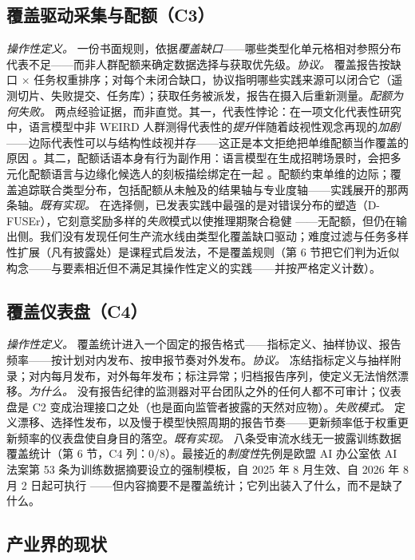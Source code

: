 \documentclass[10pt,fontset=fandol]{ctexart}
\begin{document}
\subsection{覆盖驱动采集与配额（C3）}

\emph{操作性定义。} 一份书面规则，依据\emph{覆盖缺口}——哪些类型化单元格相对参照分布代表不足——而非人群配额来确定数据选择与获取优先级。\emph{协议。} 覆盖报告按缺口 $\times$ 任务权重排序；对每个未闭合缺口，协议指明哪些实践来源可以闭合它（遥测切片、失败提交、任务库）；获取任务被派发，报告在摄入后重新测量。\emph{配额为何失败。} 两点经验证据，而非直觉。其一，代表性悖论：在一项文化代表性研究中，语言模型中非 WEIRD 人群测得代表性的\emph{提升}伴随着歧视性观念再现的\emph{加剧}——边际代表性可以与结构性歧视并存——这正是本文拒绝把单维配额当作覆盖的原因 \cite{ref14}。其二，配额话语本身有行为副作用：语言模型在生成招聘场景时，会把多元化配额语言与边缘化候选人的刻板描绘绑定在一起 \cite{ref15}。配额约束单维的边际；覆盖追踪联合类型分布，包括配额从未触及的结果轴与专业度轴——实践展开的那两条轴。\emph{既有实现。} 在选择侧，已发表实践中最强的是对错误分布的塑造（D-FUSEr），它刻意奖励多样的\emph{失败}模式以使推理期聚合稳健 \cite{ref16}——无配额，但仍在输出侧。我们没有发现任何生产流水线由类型化覆盖缺口驱动；难度过滤与任务多样性扩展（凡有披露处）是课程式启发法，不是覆盖规则（第 6 节把它们判为近似构念——与要素相近但不满足其操作性定义的实践——并按严格定义计数）。

\subsection{覆盖仪表盘（C4）}

\emph{操作性定义。} 覆盖统计进入一个固定的报告格式——指标定义、抽样协议、报告频率——按计划对内发布、按申报节奏对外发布。\emph{协议。} 冻结指标定义与抽样附录；对内每月发布，对外每年发布；标注异常；归档报告序列，使定义无法悄然漂移。\emph{为什么。} 没有报告纪律的监测器对平台团队之外的任何人都不可审计；仪表盘是 C2 变成治理接口之处（也是面向监管者披露的天然对应物）。\emph{失败模式。} 定义漂移、选择性发布，以及慢于模型快照周期的报告节奏——更新频率低于权重更新频率的仪表盘使自身目的落空。\emph{既有实现。} 八条受审流水线无一披露训练数据覆盖统计（第 6 节，C4 列：0/8）。最接近的\emph{制度性}先例是欧盟 AI 办公室依 AI 法案第 53 条为训练数据摘要设立的强制模板，自 2025 年 8 月生效、自 2026 年 8 月 2 日起可执行 \cite{ref17}——但内容摘要不是覆盖统计；它列出装入了什么，而不是缺了什么。

\subsection{产业界的现状}
\end{document}
